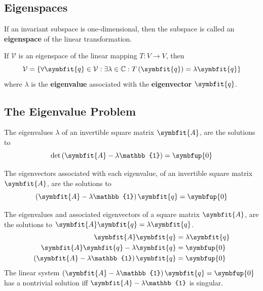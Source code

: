 \documentclass{article}
\begin{document}
\subsection{Eigenspaces}
\begin{definition}
    If an invariant subspace is one-dimensional, then the subspace is
    called an \textbf{eigenspace} of the linear transformation.
\end{definition}
\begin{theorem}
    If \(\mathcal{V}\) is an eigenspace of the linear mapping
    \(T: V \rightarrow V\), then
    \begin{equation*}
        \mathcal{V} = \left\{ \forall \symbfit{q}\in \mathcal{V}:\exists \lambda \in \mathbb{C}:T\left(\symbfit{q}\right)=\lambda \symbfit{q} \right\}
    \end{equation*}
    where \(\lambda\) is the \textbf{eigenvalue} associated with the
    \textbf{eigenvector} \(\symbfit{q}\).
\end{theorem}
\subsection{The Eigenvalue Problem}
\begin{theorem}
    The eigenvalues \(\lambda\) of an invertible square matrix
    \(\symbfit{A}\), are the solutions to
    \begin{equation*}
        \det{\left( \symbfit{A} - \lambda\mathbb{1} \right)}=\symbfup{0}
    \end{equation*}
\end{theorem}
\begin{theorem}
    The eigenvectors associated with each eigenvalue, of an invertible
    square matrix \(\symbfit{A}\), are the solutions to
    \begin{equation*}
        \left( \symbfit{A} - \lambda \mathbb{1} \right) \symbfit{q}=\symbfup{0}
    \end{equation*}
\end{theorem}
\begin{solution}[Proof]
    The eigenvalues and associated eigenvectors of a square matrix
    \(\symbfit{A}\), are the solutions to
    \(\symbfit{A}\symbfit{q}=\lambda \symbfit{q}\).
    \begin{align*}
        \symbfit{A}\symbfit{q}                                      & =\lambda \symbfit{q} \\
        \symbfit{A}\symbfit{q} - \lambda \symbfit{q}                & =\symbfup{0}         \\
        \left( \symbfit{A} - \lambda \mathbb{1} \right) \symbfit{q} & =\symbfup{0}
    \end{align*}
    The linear system
    \(\left( \symbfit{A} - \lambda\mathbb{1} \right) \symbfit{q}=\symbfup{0}\)
    has a nontrivial solution iff \(\symbfit{A} - \lambda \mathbb{1}\)
    is singular.
\end{solution}
\end{document}

